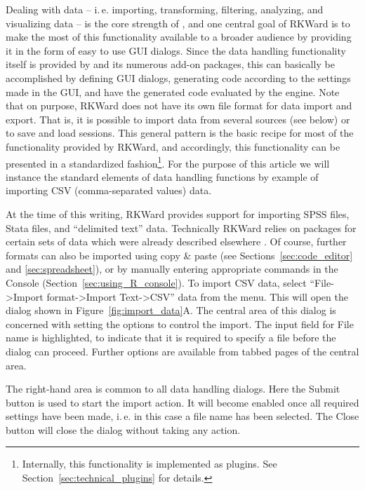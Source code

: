 Dealing with data -- i.\,e. importing, transforming, filtering, analyzing, and visualizing data --
is the core strength of , and one central goal of
RKWard is to make the most of this functionality available to a broader
audience by providing it in the form of easy to use GUI dialogs. Since
the data handling functionality itself is provided by
 and its numerous add-on packages, this
can basically be accomplished by defining GUI dialogs, generating
 code according to the settings made in
the GUI, and have the generated code evaluated by the
 engine. Note that on purpose, RKWard does not have its
own file format for data import and export. That is, it is possible
to import data from several sources (see below) or to save and load
 sessions. This general pattern is the %
basic recipe for most of the functionality provided by RKWard, and
accordingly, this functionality can be presented in a standardized
fashion\footnote{Internally, this functionality is implemented as
plugins. See Section~\ref{sec:technical_plugins} for details.}. For
the purpose of this article we will instance the standard
elements of data handling functions by example of importing CSV
(comma-separated values) data.

At the time of this writing, RKWard provides support for importing SPSS
files, Stata files, and ``delimited text'' data. Technically RKWard
relies on  packages for certain sets of
data which were already described elsewhere
\citep{Murdoch2002}. Of course, further formats can
also be imported using copy \& paste (see Sections~\ref{sec:code_editor} and \ref{sec:spreadsheet}), or by
manually entering appropriate  commands in
the  Console (Section~\ref{sec:using_R_console}). To import CSV
data, select ``File->Import format->Import Text->CSV''
data from the menu. This will open the dialog shown in
Figure~\ref{fig:import_data}A. The central area of this dialog is concerned with setting
the options to control the import. The input field for
File name is highlighted, to indicate that
it is required to specify a file before the dialog can proceed.
Further options are available from tabbed pages of the central area.

The right-hand area is common to all data handling
dialogs. Here the Submit button is used
to start the import action. It will become enabled once all required
settings have been made, i.\,e. in this case a file name has been
selected. The Close button will close the
dialog without taking any action.

